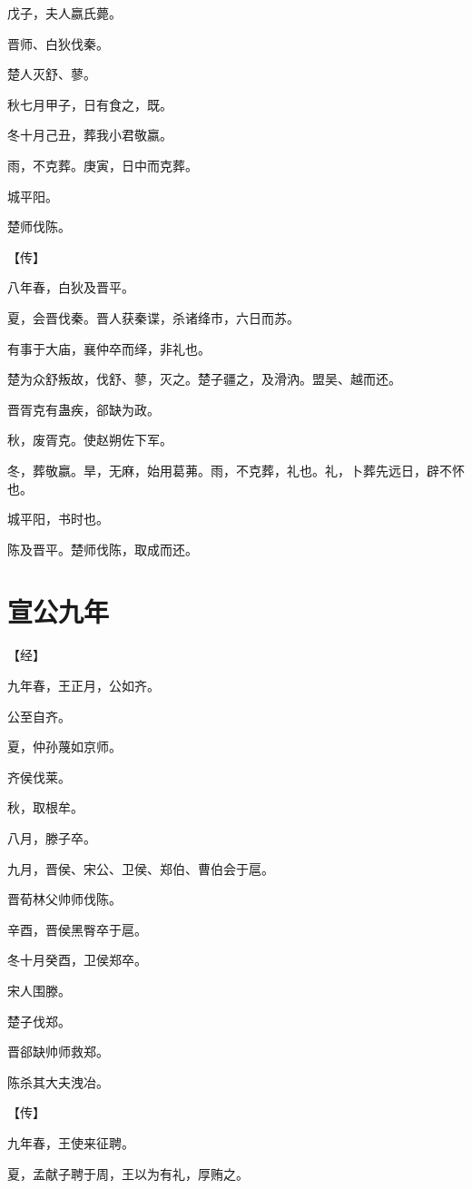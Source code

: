 \documentclass[a4paper,12pt,UTF8,twoside]{ctexbook}
\begin{document}
戊子，夫人嬴氏薨。

晋师、白狄伐秦。

楚人灭舒、蓼。

秋七月甲子，日有食之，既。

冬十月己丑，葬我小君敬嬴。

雨，不克葬。庚寅，日中而克葬。

城平阳。

楚师伐陈。

【传】

八年春，白狄及晋平。

夏，会晋伐秦。晋人获秦谍，杀诸绛市，六日而苏。

有事于大庙，襄仲卒而绎，非礼也。

楚为众舒叛故，伐舒、蓼，灭之。楚子疆之，及滑汭。盟吴、越而还。

晋胥克有蛊疾，郤缺为政。

秋，废胥克。使赵朔佐下军。

冬，葬敬嬴。旱，无麻，始用葛茀。雨，不克葬，礼也。礼，卜葬先远日，辟不怀也。

城平阳，书时也。

陈及晋平。楚师伐陈，取成而还。

\section{宣公九年}



【经】

九年春，王正月，公如齐。

公至自齐。

夏，仲孙蔑如京师。

齐侯伐莱。

秋，取根牟。

八月，滕子卒。

九月，晋侯、宋公、卫侯、郑伯、曹伯会于扈。

晋荀林父帅师伐陈。

辛酉，晋侯黑臀卒于扈。

冬十月癸酉，卫侯郑卒。

宋人围滕。

楚子伐郑。

晋郤缺帅师救郑。

陈杀其大夫洩冶。

【传】

九年春，王使来征聘。



夏，孟献子聘于周，王以为有礼，厚贿之。
\end{document}
